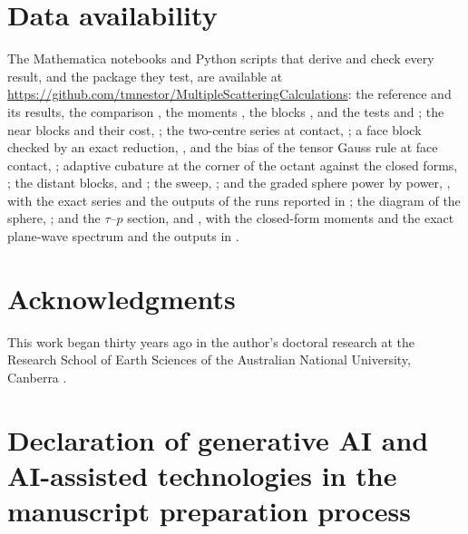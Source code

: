 \documentclass[11pt,a4paper]{article}
\begin{document}
\section*{Data availability}
{\sloppy
The Mathematica notebooks and Python scripts that derive and check every result, and the package they
test, are available at \url{https://github.com/tmnestor/MultipleScatteringCalculations}: the reference
 and its results, the comparison
, the moments
, the blocks
, and the tests
 and
; the near blocks and their cost, ; the two-centre series at contact,
; a face block checked by an exact reduction,
, and the bias of the tensor Gauss rule at face contact,
; adaptive cubature at the corner of the octant against the
closed forms, ; the distant blocks,
 and ; the
sweep, ; and the graded sphere power by power,
, with the exact series
 and the outputs of the runs reported in
; the diagram of the sphere, ; and the $\tau$--$p$ section,
 and , with the closed-form moments
 and the exact plane-wave spectrum
 and the outputs in .\par}

\section*{Acknowledgments}
This work began thirty years ago in the author's doctoral research at the Research School of Earth
Sciences of the Australian National University, Canberra \citep{Nestor1996}.

\section*{Declaration of generative AI and AI-assisted technologies in the manuscript preparation process}
\end{document}
